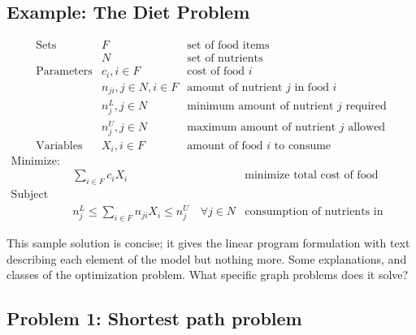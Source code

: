 \documentclass[11pt]{article}
\begin{document}
\subsection*{Example: The Diet Problem}

\begin{eqnarray*}
 \textrm{Sets} &  F & \textrm{set of food items} \\
               &  N  & \textrm{set of nutrients} \\
 \textrm{Parameters} & c_i, i\in F  & \textrm{cost of food $i$}  \\
& n_{ji}, j \in N, i \in F & \textrm{amount of nutrient $j$ in food $i$}  \\
& n^L_j, j\in N  &\textrm{minimum amount of nutrient $j$ required} \\
& n^U_j, j\in N  &\textrm{maximum amount of nutrient $j$ allowed} \\
 \textrm{Variables} & X_i, i\in F & \textrm{amount of food $i$ to consume}
\end{eqnarray*}
\begin{eqnarray*}
\textrm{Minimize:}\\
& \displaystyle \sum_{i\in F} c_i X_i & \textrm{minimize total cost of food}\\
\textrm{Subject to:}\\
& n^L_j \leq \sum_{i \in F} n_{ji} X_{i} \leq n^U_j \quad \forall j \in N & \textrm{consumption of nutrients in allowable range}
\end{eqnarray*}

This sample solution is concise; it gives the linear program
formulation with text describing each element of the model but nothing
more. Some explanations, and classes of the optimization problem. What specific graph problems does it solve?


\newpage
\subsection*{Problem 1: Shortest path problem}
\end{document}

